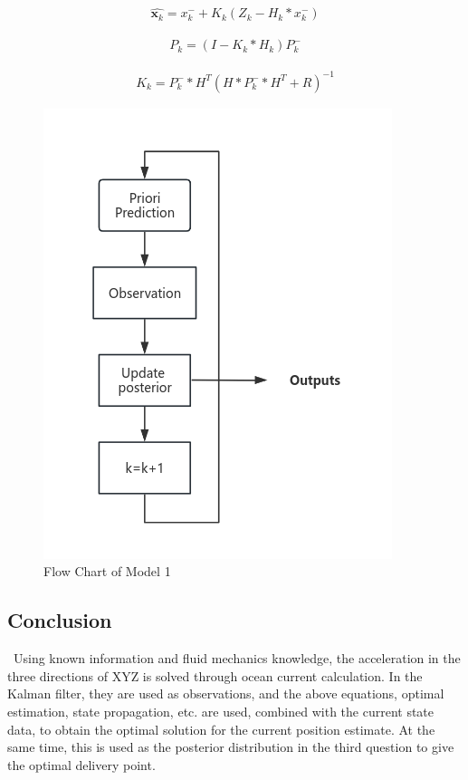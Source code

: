 \documentclass[12pt]{article}  %
\begin{document}
\begin{equation}
    \begin{aligned}
        \hat{\mathbf{x}_k}=x^-_k+K_k(Z_k-H_k*x^-_k)
    \end{aligned}
\end{equation}

\begin{equation}
    \begin{aligned}
        P_k=(I-K_k*H_k)P^-_k
    \end{aligned}
\end{equation}

\begin{equation}
    \begin{aligned}
        K_k=P^-_k*H^T(H*P^-_k*H^T+R)^{-1}
    \end{aligned}
\end{equation}

\begin{figure}[htbp]  %
    \centering  %
    \includegraphics[width=.6\textwidth]{model1.1.png} %
    \caption{Flow Chart of Model 1} %
    \end{figure}
    \vspace{-0.8cm}

\subsection{Conclusion}\
\indent Using known information and fluid mechanics knowledge, the acceleration in the three directions of XYZ is solved through ocean current calculation. In the Kalman filter, they are used as observations, and the above equations, optimal estimation, state propagation, etc. are used, combined with the current state data, to obtain the optimal solution for the current position estimate. At the same time, this is used as the posterior distribution in the third question to give the optimal delivery point.
\end{document}
